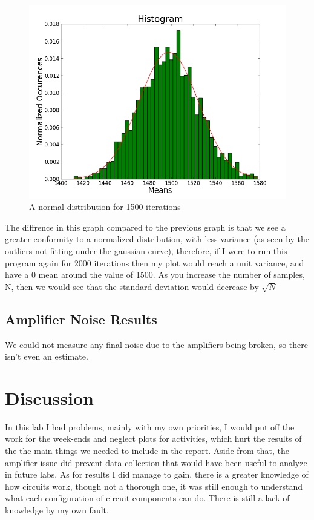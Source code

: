 \documentclass[12 pt]{article}
\begin{document}
\begin{figure}[H]
\center
\includegraphics[scale=.6]{central_limit_4.png}
\caption{A normal distribution for 1500 iterations}
\label{central2}
\end{figure}
The diffrence in this graph compared to the previous graph is that we
see a greater conformity to a normalized distribution, with less
variance (as seen by the outliers not fitting under the gaussian curve), therefore, if I were to run this program again for 2000
iterations then my plot would reach a unit variance,  and have a 0 mean
around the value of 1500. 
As you increase the number of samples, N, then we would see that the
standard deviation would decrease by $\sqrt{N}$

\subsection{Amplifier Noise Results}
We could not measure any final noise due to the amplifiers being broken,
so there isn't even an estimate.

\section{Discussion}
In this lab I had problems, mainly with my own priorities, I would put
off the work for the week-ends and neglect plots for activities, which
hurt the results of the the main things we needed to include in the
report. Aside from that, the amplifier issue did prevent data collection
that would have been useful to analyze in future labs. As for results I
did manage to gain, there is a greater knowledge of how circuits work,
though not a thorough one, it was still enough to understand what each
configuration of circuit components can do. There is still a lack of
knowledge by my own fault. 
\end{document}
